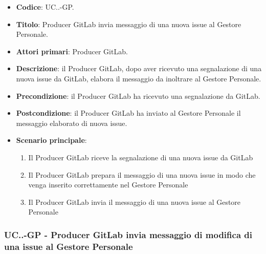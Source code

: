 			\begin{itemize}
				\item \textbf{Codice}: UC\theuccount.\thesubuccount.\thesubsubuccount-GP.
				\item \textbf{Titolo}: Producer GitLab invia messaggio di una nuova issue al Gestore Personale.
				\item \textbf{Attori primari}: Producer GitLab.
				\item \textbf{Descrizione}: il Producer GitLab, dopo aver ricevuto una segnalazione di una nuova issue da GitLab, elabora il messaggio da inoltrare al Gestore Personale.
				\item \textbf{Precondizione}: il Producer GitLab ha ricevuto una segnalazione da GitLab.
				\item \textbf{Postcondizione}: il Producer GitLab ha inviato al Gestore Personale il messaggio   \newline elaborato di nuova issue.
				\item \textbf{Scenario principale}: 
				\begin{enumerate}
					\item Il Producer GitLab riceve la segnalazione di una nuova issue da GitLab
					\item Il Producer GitLab prepara il messaggio di una nuova issue in modo che venga inserito correttamente nel Gestore Personale
					\item Il Producer GitLab invia il messaggio di una nuova issue al Gestore Personale
				\end{enumerate}
				
			\end{itemize}
		
		\subsubsection{UC\theuccount.\thesubuccount.\thesubsubuccount-GP - Producer GitLab invia messaggio di modifica di una issue al Gestore Personale}
			
